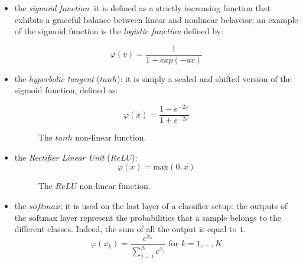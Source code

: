\begin{itemize}
\item the \textit{sigmoid function}: it is defined as a strictly increasing function that exhibits a graceful balance between linear and nonlinear behavior; an example of the sigmoid function is the \textit{logistic function} defined by:

\begin{equation}
\varphi \left( v \right) =\frac { 1 }{ 1+exp\left( -av \right)  } 
\end{equation}


\item the \textit{ hyperbolic tangent } ($tanh$): it is simply a scaled and shifted version of the sigmoid function, defined as:

\begin{equation}
\varphi(x) = \frac{1-e^{-2x}}{1+e^{-2x}}
\end{equation}


\begin{figure}[h]
	\centering
	\resizebox{0.4\textwidth}{!}{
	}
\caption[The $tanh$]{The $tanh$ non-linear function.}
\end{figure}


\item the \textit{ Rectifier Linear Unit} ($ReLU$):
\begin{equation}
\varphi(x) = \text{max}(0,x)
\end{equation}
\begin{figure}[h!]
	\centering
	\resizebox{0.4\textwidth}{!}{
	}
	\caption[The $ReLU$]{The $ReLU$ non-linear function.}
\end{figure}

\item the $softmax$: it is used on the last layer of a classifier setup: the outputs of the softmax layer represent the probabilities that a sample belongs to the different classes. Indeed, the sum of all the output is equal to $1$.
\begin{equation}
\varphi(x_k) = \frac{e^{x_k}}{\sum_{j=1}^{N}e^{x_j}} \text{ for }  k=1,\dots,K
\end{equation}
\end{itemize}

